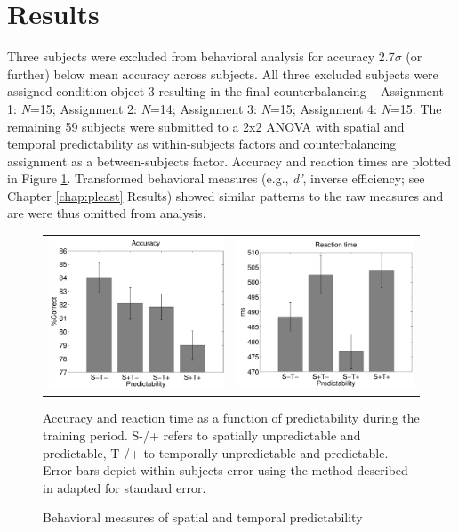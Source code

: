\documentclass[dwyatte_dissertation.tex]{subfiles}
\begin{document}
\section{Results}
Three subjects were excluded from behavioral analysis for accuracy 2.7$\sigma$ (or further) below mean accuracy across subjects. All three excluded subjects were assigned condition-object 3 resulting in the final counterbalancing -- Assignment 1: \textit{N}=15; Assignment 2: \textit{N}=14; Assignment 3: \textit{N}=15; Assignment 4: \textit{N}=15. The remaining 59 subjects were submitted to a 2x2 ANOVA with spatial and temporal predictability as within-subjects factors and counterbalancing assignment as a between-subjects factor. Accuracy and reaction times are plotted in Figure \ref{fig:bpleast_behave}. Transformed behavioral measures (e.g., \textit{d'}, inverse efficiency; see Chapter \ref{chap:pleast} Results) showed similar patterns to the raw measures and are were thus omitted from analysis.

\begin{figure}[h!]
\begin{center}
\begin{tabular}{ll}
\includegraphics[width=80mm]{figs/chap_bpleast/results_accuracy.pdf} & 
\includegraphics[width=80mm]{figs/chap_bpleast/results_rt.pdf} \\
\end{tabular}
\end{center}
\caption{Behavioral measures of spatial and temporal predictability}{Accuracy and reaction time as a function of predictability during the training period. S-/+ refers to spatially unpredictable and predictable, T-/+ to temporally unpredictable and predictable. Error bars depict within-subjects error using the method described in \protect{} adapted for standard error.}
\label{fig:bpleast_behave}
\end{figure}
\end{document}
